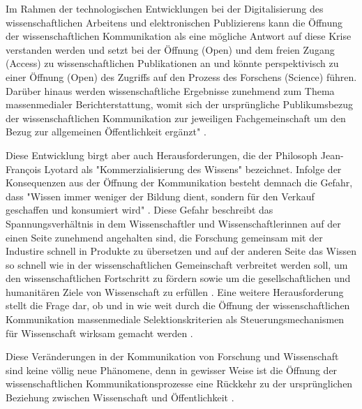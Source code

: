 Im Rahmen der technologischen Entwicklungen bei der Digitalisierung des wissenschaftlichen Arbeitens und elektronischen Publizierens kann die Öffnung der wissenschaftlichen Kommunikation als eine mögliche Antwort auf diese Krise verstanden werden und setzt bei der Öffnung (Open) und dem freien Zugang (Access) zu wissenschaftlichen Publikationen an und könnte perspektivisch zu einer Öffnung (Open) des Zugriffs auf den Prozess des Forschens (Science) führen. Darüber hinaus werden wissenschaftliche Ergebnisse zunehmend zum Thema massenmedialer Berichterstattung, womit sich der ursprüngliche Publikumsbezug der wissenschaftlichen Kommunikation zur jeweiligen Fachgemeinschaft um den Bezug zur allgemeinen Öffentlichkeit ergänzt" \cite{bbaw_publizieren_2015} .

Diese Entwicklung birgt aber auch Herausforderungen, die der Philosoph Jean-François Lyotard als "Kommerzialisierung des Wissens" \cite{lyotard_1993_postmoderne} bezeichnet. Infolge der Konsequenzen aus der Öffnung der Kommunikation besteht demnach die Gefahr, dass "Wissen immer weniger der Bildung dient, sondern für den Verkauf geschaffen und konsumiert wird" \cite{hagner_2015_sache_buches}. Diese Gefahr beschreibt das Spannungsverhältnis in dem Wissenschaftler und Wissenschaftlerinnen auf der einen Seite zunehmend angehalten sind, die Forschung gemeinsam mit der Industire schnell in Produkte zu übersetzen und auf der anderen Seite das Wissen so schnell wie in der wissenschaftlichen Gemeinschaft verbreitet werden soll, um den wissenschaftlichen Fortschritt zu fördern sowie um die gesellschaftlichen und humanitären Ziele von Wissenschaft zu erfüllen \cite{harmon_2012_commercialization} \cite{Woelfle_2011}. Eine weitere Herausforderung stellt die Frage dar, ob und in wie weit durch die Öffnung der wissenschaftlichen Kommunikation massenmediale Selektionskriterien als Steuerungsmechanismen für Wissenschaft wirksam gemacht werden \cite{bbaw_publizieren_2015}.

Diese Veränderungen in der Kommunikation von Forschung und Wissenschaft sind keine völlig neue Phänomene, denn in gewisser Weise ist die Öffnung der wissenschaftlichen Kommunikationsprozesse eine Rückkehr zu der ursprünglichen Beziehung zwischen Wissenschaft und Öffentlichkeit \cite{Konneker_2013}.


